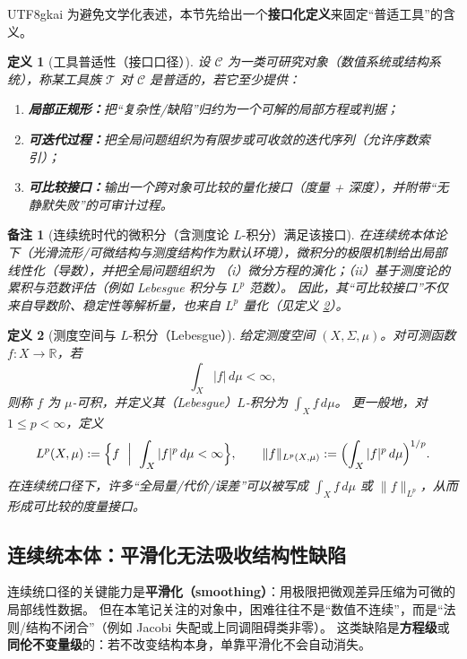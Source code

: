 \documentclass[12pt]{article}
\newtheorem{definition}{定义}[section]
\newtheorem{remark}{备注}[section]
\begin{document}
\begin{CJK*}{UTF8}{gkai}
为避免文学化表述，本节先给出一个\textbf{接口化定义}来固定“普适工具”的含义。

\begin{definition}[工具普适性（接口口径）]
\label{def:tool-universality-interface}
设 $\mathcal{C}$ 为一类可研究对象（数值系统或结构系统），称某工具族 $\mathcal{T}$ 对 $\mathcal{C}$ 是\emph{普适的}，若它至少提供：
\begin{enumerate}
  \item \textbf{局部正规形：}把“复杂性/缺陷”归约为一个可解的局部方程或判据；
  \item \textbf{可迭代过程：}把全局问题组织为有限步或可收敛的迭代序列（允许序数索引）；
  \item \textbf{可比较接口：}输出一个跨对象可比较的量化接口（度量 + 深度），并附带“无静默失败”的可审计过程。
\end{enumerate}
\end{definition}

\begin{remark}[连续统时代的微积分（含测度论 $L$-积分）满足该接口]
在连续统本体论下（光滑流形/可微结构与测度结构作为默认环境），微积分的极限机制给出局部线性化（导数），并把全局问题组织为
（i）微分方程的演化；（ii）基于测度论的累积与范数评估（例如 Lebesgue 积分与 $L^p$ 范数）。
因此，其“可比较接口”不仅来自导数阶、稳定性等解析量，也来自 $L^p$ 量化（见定义 \ref{def:measure-Lp-integral}）。
\end{remark}

\begin{definition}[测度空间与 $L$-积分（Lebesgue）]\label{def:measure-Lp-integral}
给定测度空间 $(X,\Sigma,\mu)$。对可测函数 $f:X\to\mathbb{R}$，若
\[
  \int_X |f|\,d\mu < \infty,
\]
则称 $f$ 为 $\mu$-可积，并定义其（Lebesgue）$L$-积分为 $\int_X f\,d\mu$。
更一般地，对 $1\le p<\infty$，定义
\[
  L^p(X,\mu):=\Bigl\{f\ \Bigm|\ \int_X |f|^p\,d\mu<\infty\Bigr\},
  \qquad
  \|f\|_{L^p(X,\mu)}:=\Bigl(\int_X |f|^p\,d\mu\Bigr)^{1/p}.
\]
在连续统口径下，许多“全局量/代价/误差”可以被写成 $\int_X f\,d\mu$ 或 $\|f\|_{L^p}$，从而形成可比较的度量接口。
\end{definition}

\subsection{连续统本体：平滑化无法吸收结构性缺陷}

连续统口径的关键能力是\textbf{平滑化（smoothing）}：用极限把微观差异压缩为可微的局部线性数据。
但在本笔记关注的对象中，困难往往不是“数值不连续”，而是“法则/结构不闭合”（例如 Jacobi 失配或上同调阻碍类非零）。
这类缺陷是\textbf{方程级}或\textbf{同伦不变量级}的：若不改变结构本身，单靠平滑化不会自动消失。


\end{CJK*}
\end{document}
